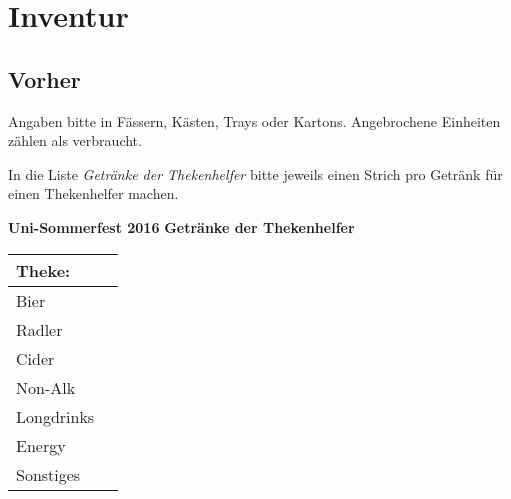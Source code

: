 \section{Inventur}

\renewcommand{\arraystretch}{1.4}
\subsection{Vorher}
Angaben bitte in Fässern, Kästen, Trays oder Kartons. Angebrochene Einheiten zählen als verbraucht.

In die Liste \emph{Getränke der Thekenhelfer} bitte jeweils einen Strich pro Getränk für einen Thekenhelfer machen.
\cleardoublepage
{\large
\begin{center}
  \textbf{Uni-Sommerfest 2016} \hfill \textbf{Getränke der Thekenhelfer}\\[0.5cm]
\begin{tabular}{|p{2.5cm}|l|}
  \hline
  \multicolumn{2}{|l|}{\textbf{Theke:}  \hfill} \\
  \hline
  \multirow{3}{*}{Bier}
  &  \\
  &  \\
  &  \\
  \hline
  \multirow{3}{*}{Radler}
  &  \\
  &  \\
  &  \\
  \hline
  \multirow{3}{*}{Cider}
  &  \\
  &  \\
  &  \\
  \hline
  \multirow{4}{*}{Non-Alk}
  &  \\
  &  \\
  &  \\
  &  \\
  \hline
  \multirow{3}{*}{Longdrinks}
  &  \\
  &  \\
  &  \\
  \hline
  \multirow{3}{*}{Energy}
  &  \\
  &  \\
  &  \\
  \hline
  \multirow{3}{*}{Sonstiges}
  &  \\
  &  \\
  &  \\
  \hline

\end{tabular}
\end{center}
}
